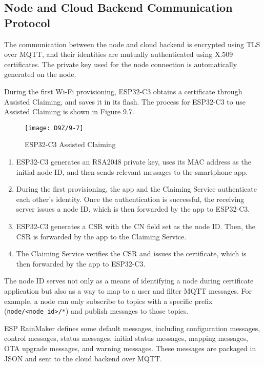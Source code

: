 \documentclass[a4paper,12pt]{book}
\begin{document}
\subsection{Node and Cloud Backend Communication Protocol}
The communication between the node and cloud backend is encrypted using TLS over MQTT, and their identities are mutually authenticated using X.509 certificates. The private key used for the node connection is automatically generated on the node.

During the first Wi-Fi provisioning, ESP32-C3 obtains a certificate through Assisted Claiming, and saves it in its flash. The process for ESP32-C3 to use Assisted Claiming is shown in Figure 9.7.

\begin{figure}[!h]
    \centering
    \texttt{[image: D9Z/9-7]}
    \caption{ESP32-C3 Assisted Claiming}
\end{figure}

\begin{enumerate}[label=(\arabic*)]
    \item ESP32-C3 generates an RSA2048 private key, uses its MAC address as the initial node ID, and then sends relevant messages to the smartphone app.
    \item During the first provisioning, the app and the Claiming Service authenticate each other’s identity. Once the authentication is successful, the receiving server issues a node ID, which is then forwarded by the app to ESP32-C3.
    \item ESP32-C3 generates a CSR with the CN field set as the node ID. Then, the CSR is forwarded by the app to the Claiming Service.
    \item The Claiming Service verifies the CSR and issues the certificate, which is then forwarded by the app to ESP32-C3.
\end{enumerate}

The node ID serves not only as a means of identifying a node during certificate application but also as a way to map to a user and filter MQTT messages. For example, a node can only subscribe to topics with a specific prefix (\verb|node/<node_id>/*|) and publish messages to those topics.

ESP RainMaker defines some default messages, including configuration messages, control messages, status messages, initial status messages, mapping messages, OTA upgrade messages, and warning messages. These messages are packaged in JSON and sent to the cloud backend over MQTT.
\end{document}
